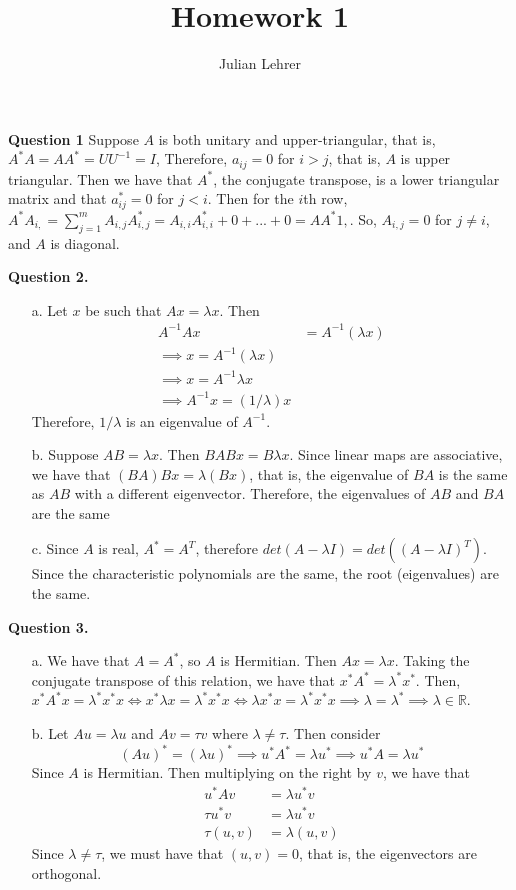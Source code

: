 \documentclass{article}
\title{Homework 1}
\date{}
\author{Julian Lehrer}
\newcommand{\R}{\mathbb{R}}
\begin{document}
\maketitle
\textbf{Question 1}
Suppose $A$ is both unitary and upper-triangular, that is,
$A^*A=AA^*=UU^{-1}=I$, Therefore, $a_{ij} = 0$ for $i > j$, that is, $A$ is upper triangular. Then we have that $A^*$, the conjugate transpose, is a lower triangular matrix and that $a^*_{ij} = 0$ for $j < i$. Then for the $i$th row, $A^*A_{i, } = \sum_{j=1}^m A_{i, j}A^*_{i, j}=A_{i, i}A^{*}_{i, i }+ 0+...+0 = AA^*{1, }$. So, $A_{i,j}=0$ for $j \neq i$, and $A$ is diagonal. 

\textbf{Question 2.} 
\begin{itemize}
    \item[a.] Let $x$ be such that $Ax =\lambda x$. Then 
    \begin{align*}
        A^{-1}Ax &= A^{-1}\left(\lambda x\right) \\ 
        \implies x = A^{-1}\left(\lambda x\right)\\
        \implies x=A^{-1}\lambda x \\
        \implies A^{-1}x = (1/\lambda) x
    \end{align*}
    Therefore, $1/\lambda$ is an eigenvalue of $A^{-1}$. 
    \item[b.] Suppose $AB = \lambda x$. Then $BAB x= B\lambda x$. Since linear maps are associative, we have that $(BA)Bx = \lambda(Bx)$, that is, the eigenvalue of $BA$ is the same as $AB$ with a different eigenvector. Therefore, the eigenvalues of $AB$ and $BA$ are the same 
    \item[c.] Since $A$ is real, $A^* = A^T$, therefore $det(A-\lambda I) = det((A-\lambda I)^T)$. Since the characteristic polynomials are the same, the root (eigenvalues) are the same. 
\end{itemize}

\textbf{Question 3.} 
\begin{itemize}
    \item[a.] We have that $A = A^*$, so $A$ is Hermitian. Then $Ax = \lambda x$. Taking the conjugate transpose of this relation, we have that $x^*A^* = \lambda^*x^*$. Then, $x^*A^*x = \lambda^*x^* x \iff x^*\lambda x = \lambda^*x^*x \iff \lambda x^*x = \lambda^* x^*x \implies \lambda = \lambda^* \implies \lambda \in \R$. 
    \item[b.] Let $Au = \lambda u$ and $Av = \tau v$ where $\lambda \neq \tau$. Then consider 
    \begin{equation*}
        (Au)^* = (\lambda u)^* \implies u^*A^* = \lambda u^* \implies u^*A = \lambda u^*
    \end{equation*}
    Since $A$ is Hermitian. Then multiplying on the right by $v$, we have that 
    \begin{align*}
        u^*Av &= \lambda u^*v \\
        \tau u^*v &= \lambda u^* v\\
        \tau (u, v) &= \lambda (u, v)
    \end{align*} 
    Since $\lambda \neq \tau$, we must have that $(u,v)=0$, that is, the eigenvectors are orthogonal. 
\end{itemize}
\end{document}
